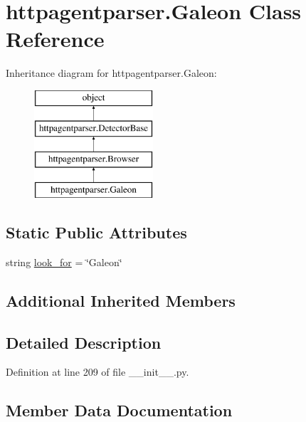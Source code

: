 \hypertarget{classhttpagentparser_1_1_galeon}{}\section{httpagentparser.\+Galeon Class Reference}
\label{classhttpagentparser_1_1_galeon}
Inheritance diagram for httpagentparser.\+Galeon\+:\begin{figure}[H]
\begin{center}
\leavevmode
\includegraphics[height=4.000000cm]{classhttpagentparser_1_1_galeon}
\end{center}
\end{figure}
\subsection*{Static Public Attributes}
\begin{DoxyCompactItemize}
\item 
string \hyperlink{classhttpagentparser_1_1_galeon_addb1c85acf00d134fb4518a42db4acf2}{look\+\_\+for} = \char`\"{}Galeon\char`\"{}
\end{DoxyCompactItemize}
\subsection*{Additional Inherited Members}


\subsection{Detailed Description}


Definition at line 209 of file \+\_\+\+\_\+init\+\_\+\+\_\+.\+py.



\subsection{Member Data Documentation}
\hypertarget{classhttpagentparser_1_1_galeon_addb1c85acf00d134fb4518a42db4acf2}{}\label{classhttpagentparser_1_1_galeon_addb1c85acf00d134fb4518a42db4acf2} 
